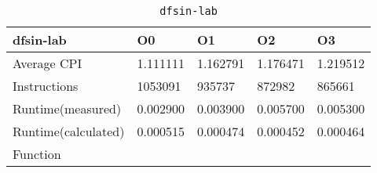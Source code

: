 \begin{table}[ht!]
\centering
\caption{\texttt{dfsin-lab}}
\label{tab:dfsin-lab}
\begin{tabular}{|l|l|l|l|l|}
\hline
\textbf{dfsin-lab}	&	\textbf{O0}	&	\textbf{O1}	&	\textbf{O2}	&	\textbf{O3}	\\\hline\hline
Average CPI	&	1.111111	&	1.162791	&	1.176471	&	1.219512	\\\hline
Instructions	&	1053091	&	935737	&	872982	&	865661	\\\hline
Runtime(measured)	&	0.002900	&	0.003900	&	0.005700	&	0.005300	\\\hline
Runtime(calculated)	&	0.000515	&	0.000474	&	0.000452	&	0.000464	\\\hline
Function	&		&		&		&		\\\hline
\end{tabular}
\end{table}
